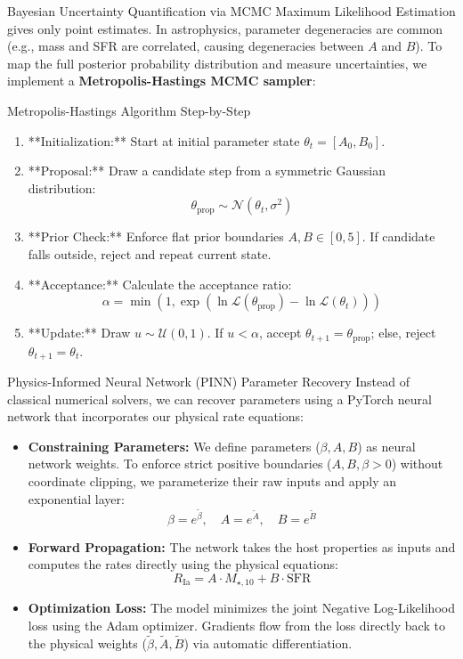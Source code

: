 \documentclass[9pt]{beamer}
\begin{document}
\begin{frame}{Bayesian Uncertainty Quantification via MCMC}
  Maximum Likelihood Estimation gives only point estimates. In astrophysics, parameter degeneracies are common (e.g., mass and SFR are correlated, causing degeneracies between $A$ and $B$).
  To map the full posterior probability distribution and measure uncertainties, we implement a \textbf{Metropolis-Hastings MCMC sampler}:
  \begin{block}{Metropolis-Hastings Algorithm Step-by-Step}
    \begin{enumerate}
      \item **Initialization:** Start at initial parameter state $\theta_t = [A_0, B_0]$.
      \item **Proposal:** Draw a candidate step from a symmetric Gaussian distribution:
        $$\theta_{\text{prop}} \sim \mathcal{N}(\theta_t, \sigma^2)$$
      \item **Prior Check:** Enforce flat prior boundaries $A, B \in [0, 5]$. If candidate falls outside, reject and repeat current state.
      \item **Acceptance:** Calculate the acceptance ratio:
        $$\alpha = \min\left(1, \exp(\ln \mathcal{L}(\theta_{\text{prop}}) - \ln \mathcal{L}(\theta_t))\right)$$
      \item **Update:** Draw $u \sim \mathcal{U}(0, 1)$. If $u < \alpha$, accept $\theta_{t+1} = \theta_{\text{prop}}$; else, reject $\theta_{t+1} = \theta_t$.
    \end{enumerate}
  \end{block}
\end{frame}

\begin{frame}{Physics-Informed Neural Network (PINN) Parameter Recovery}
  Instead of classical numerical solvers, we can recover parameters using a PyTorch neural network that incorporates our physical rate equations:
  \begin{itemize}
    \item \textbf{Constraining Parameters:} We define parameters ($\beta, A, B$) as neural network weights. To enforce strict positive boundaries ($A, B, \beta > 0$) without coordinate clipping, we parameterize their raw inputs and apply an exponential layer:
      $$\beta = e^{\tilde{\beta}}, \quad A = e^{\tilde{A}}, \quad B = e^{\tilde{B}}$$
    \item \textbf{Forward Propagation:} The network takes the host properties as inputs and computes the rates directly using the physical equations:
      $$R_{\text{Ia}} = A \cdot M_{\star, 10} + B \cdot \text{SFR}$$
    \item \textbf{Optimization Loss:} The model minimizes the joint Negative Log-Likelihood loss using the Adam optimizer. Gradients flow from the loss directly back to the physical weights ($\tilde{\beta}, \tilde{A}, \tilde{B}$) via automatic differentiation.
  \end{itemize}
\end{frame}
\end{document}
